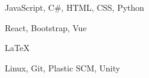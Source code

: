 \documentclass[11pt]{spidercv}
\begin{document}
    \begin{SideBar}{\ColorBackground}{\ColorTextSide}
        
        
        
        \vspace*{1cm}

        \begin{ItemList}{\ColorHighlight}
            \item [\faCode] JavaScript, C\#, HTML, CSS, Python 
            \item [\faCubes] React, Bootstrap, Vue 
            \item [\faPencilSquareO] {\LaTeX} 
            \item [\faGear] Linux, Git, Plastic SCM, Unity 
        \end{ItemList}

        \vspace*{1cm}


        \begin{SpiderDiagram}{\ColorTextSide}{\ColorHighlight}
        \end{SpiderDiagram}

        \vspace*{1cm}


        \begin{SkillGauges}{\ColorHighlight}
        \end{SkillGauges}
    \end{SideBar}

    

    \DefineProfile{\ColorOther}{\ColorTextSide}{}
\end{document}
